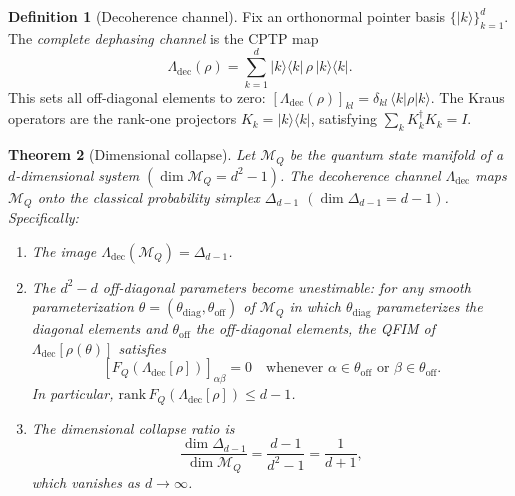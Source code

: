 \documentclass[12pt,a4paper]{article}
\newtheorem{theorem}{Theorem}[section]
\theoremstyle{definition}
\newtheorem{definition}[theorem]{Definition}
\theoremstyle{remark}
\begin{document}
\begin{definition}[Decoherence channel]
\label{def:decoherence-channel}
Fix an orthonormal pointer basis $\{|k\rangle\}_{k=1}^d$. The \emph{complete dephasing channel} is the CPTP map
\begin{equation}
\label{eq:dephasing}
\Lambda_{\mathrm{dec}}(\rho) = \sum_{k=1}^d |k\rangle\langle k|\, \rho\, |k\rangle\langle k|.
\end{equation}
This sets all off-diagonal elements to zero: $[\Lambda_{\mathrm{dec}}(\rho)]_{kl} = \delta_{kl}\, \langle k|\rho|k\rangle$. The Kraus operators are the rank-one projectors $K_k = |k\rangle\langle k|$, satisfying $\sum_k K_k^\dagger K_k = I$.
\end{definition}

\begin{theorem}[Dimensional collapse]
\label{thm:dim-collapse}
Let $\mathcal{M}_Q$ be the quantum state manifold of a $d$-dimensional system $(\dim \mathcal{M}_Q = d^2 - 1)$. The decoherence channel $\Lambda_{\mathrm{dec}}$ maps $\mathcal{M}_Q$ onto the classical probability simplex $\Delta_{d-1}$ $(\dim \Delta_{d-1} = d-1)$. Specifically:

\begin{enumerate}
\item[\emph{(i)}] The image $\Lambda_{\mathrm{dec}}(\mathcal{M}_Q) = \Delta_{d-1}$.

\item[\emph{(ii)}] The $d^2 - d$ off-diagonal parameters become unestimable: for any smooth parameterization $\theta = (\theta_{\mathrm{diag}}, \theta_{\mathrm{off}})$ of $\mathcal{M}_Q$ in which $\theta_{\mathrm{diag}}$ parameterizes the diagonal elements and $\theta_{\mathrm{off}}$ the off-diagonal elements, the QFIM of $\Lambda_{\mathrm{dec}}[\rho(\theta)]$ satisfies
\begin{equation}
\label{eq:offdiag-vanish}
[F_Q(\Lambda_{\mathrm{dec}}[\rho])]_{\alpha\beta} = 0 \quad \text{whenever } \alpha \in \theta_{\mathrm{off}} \text{ or } \beta \in \theta_{\mathrm{off}}.
\end{equation}
In particular, $\mathrm{rank}\, F_Q(\Lambda_{\mathrm{dec}}[\rho]) \leq d - 1$.

\item[\emph{(iii)}] The dimensional collapse ratio is
\begin{equation}
\label{eq:collapse-ratio}
\frac{\dim \Delta_{d-1}}{\dim \mathcal{M}_Q} = \frac{d-1}{d^2-1} = \frac{1}{d+1},
\end{equation}
which vanishes as $d \to \infty$.
\end{enumerate}
\end{theorem}
\end{document}
